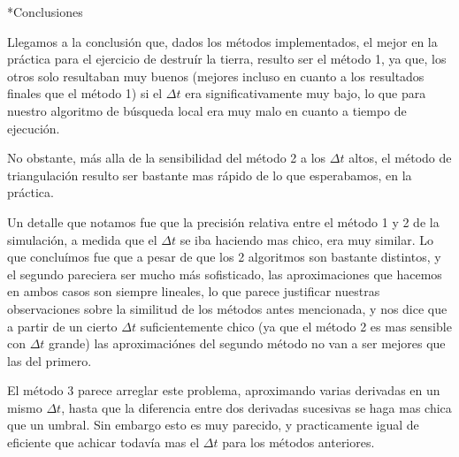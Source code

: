 \documentclass[12pt,titlepage]{article}
\begin{document}
	\begin{section}*{Conclusiones}	

		Llegamos a la conclusión que, dados los métodos implementados,
		el mejor en la práctica para el ejercicio de destruír la tierra, resulto ser el método 1, ya que,
		los otros solo resultaban muy buenos (mejores incluso en cuanto a los resultados finales que el método 1)
		si el $\Delta t$ era significativamente muy bajo,
		lo que para nuestro algoritmo de búsqueda local era muy malo en cuanto a tiempo de ejecución.

		No obstante, más alla de la sensibilidad del método 2 a los $\Delta t$ altos,
		el método de triangulación resulto ser bastante mas rápido de lo que esperabamos, en la práctica.

		Un detalle que notamos fue que la precisión relativa entre el método 1 y 2 de la simulación, a medida que el $\Delta t$ se iba haciendo mas chico,
		era muy similar. Lo que concluímos fue que a pesar de que los 2 algoritmos son bastante distintos,
		y el segundo pareciera ser mucho más sofisticado, las aproximaciones que hacemos en ambos casos son siempre lineales,
		lo que parece justificar nuestras observaciones sobre la similitud de los métodos antes mencionada,
		y nos dice que a partir de un cierto $\Delta t$ suficientemente chico (ya que el método 2 es mas sensible con $\Delta t$ grande) las aproximaciónes del segundo método
		no van a ser mejores que las del primero.

		El método 3 parece arreglar este problema, aproximando varias derivadas en un mismo $\Delta t$,
		hasta que la diferencia entre dos derivadas sucesivas se haga mas chica que un umbral.
		Sin embargo esto es muy parecido, y practicamente igual de eficiente que achicar todavía mas el $\Delta t$ para los métodos anteriores.

	\end{section}
	
\end{document}

